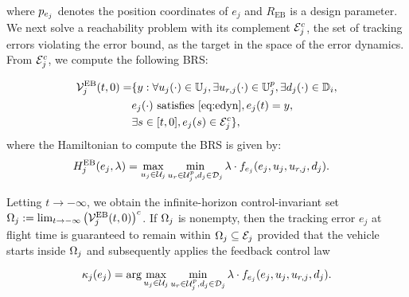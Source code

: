 \noindent where $p_{e_j}$ denotes the position coordinates of $e_j$ and $R_{\text{EB}}$ is a design parameter. We next solve a reachability problem with its complement $\mathcal{E}_j^c$, the set of tracking errors violating the error bound, as the target in the space of the error dynamics. From $\mathcal{E}_j^c$, we compute the following BRS:

\begin{equation} \label{eqn:errBound}
\begin{aligned}
\mathcal{V}^{\text{EB}}_{j}(t, 0) = & \{y: \forall u_j(\cdot) \in \mathbb{U}_j, \exists u_{r, j}(\cdot) \in \mathbb{U}^p_j, \exists d_j(\cdot) \in \mathbb{D}_i, \\
& e_j(\cdot) \text{ satisfies \eqref{eq:edyn}}, e_j(t) = y, \\
& \exists s \in [t, 0], e_j(s) \in \mathcal{E}_j^c\}, 
\end{aligned}
\end{equation}
where the Hamiltonian to compute the BRS is given by:
\begin{equation}
\begin{aligned}
H^{\text{EB}}_{j}(e_j, \lambda) &= \max_{u_j \in \mathcal{U}_j} \min_{u_r \in \mathcal{U}^p_j, d_j \in \mathcal{D}_j} \lambda \cdot f_{e_j}(e_j, u_j, u_{r,j}, d_j).
\end{aligned}
\end{equation}

Letting $t \to -\infty$, we obtain the infinite-horizon control-invariant set $\Omega_j := \lim_{t \to -\infty} \left( \mathcal{V}^{\text{EB}}_{j}(t, 0) \right)^c$. If $\Omega_j$ is nonempty, then the tracking error $e_j$ at flight time is guaranteed to remain within $\Omega_j \subseteq \mathcal{E}_j$ provided that the vehicle starts inside $\Omega_j$ and subsequently applies the feedback control law

\begin{equation}
\label{eq:robust_tracking_law}
\kappa_j(e_j) = \arg\max_{u_j \in \mathcal{U}_j} \min_{u_r \in\mathcal{U}^p_j, d_j \in \mathcal{D}_j} \lambda \cdot f_{e_j}(e_j,u_j,u_{r, j},d_j).
\end{equation}

